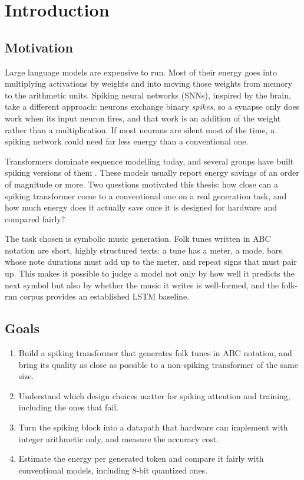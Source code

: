 \chapter{Introduction}
\label{ch:intro}

\section{Motivation}

Large language models are expensive to run. Most of their energy goes into multiplying activations by weights
and into moving those weights from memory to the arithmetic units. Spiking neural networks (SNNs), inspired by
the brain, take a different approach: neurons exchange binary \emph{spikes}, so a synapse only does work when its
input neuron fires, and that work is an addition of the weight rather than a multiplication. If most neurons are
silent most of the time, a spiking network could need far less energy than a conventional one.

Transformers \citep{vaswani2017attention} dominate sequence modelling today, and several groups have built
spiking versions of them \citep{zhou2023spikformer, yao2023spikedriven, zhu2023spikegpt}. These models usually
report energy savings of an order of magnitude or more. Two questions motivated this thesis: how close can a
spiking transformer come to a conventional one on a real generation task, and how much energy does it actually
save once it is designed for hardware and compared fairly?

The task chosen is symbolic music generation. Folk tunes written in ABC notation are short, highly structured
texts: a tune has a meter, a mode, bars whose note durations must add up to the meter, and repeat signs that must
pair up. This makes it possible to judge a model not only by how well it predicts the next symbol but also by
whether the music it writes is well-formed, and the folk-rnn corpus \citep{sturm2016folkrnn} provides an
established LSTM baseline.

\section{Goals}

\begin{enumerate}
  \item Build a spiking transformer that generates folk tunes in ABC notation, and bring its quality as close as
        possible to a non-spiking transformer of the same size.
  \item Understand which design choices matter for spiking attention and training, including the ones that fail.
  \item Turn the spiking block into a datapath that hardware can implement with integer arithmetic only, and
        measure the accuracy cost.
  \item Estimate the energy per generated token and compare it fairly with conventional models, including
        8-bit quantized ones.
\end{enumerate}

